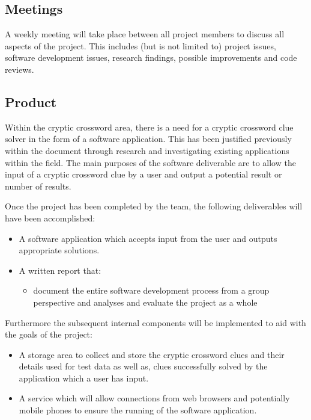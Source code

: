 \subsection{Meetings}

A weekly meeting will take place between all project members to discuss all
aspects of the project. This includes (but is not limited to) project issues,
software development issues, research findings, possible improvements and code
reviews.


\subsection{Product}

Within the cryptic crossword area, there is a need for a cryptic crossword clue
solver in the form of a software application.  This has been justified
previously within the document through research and investigating existing
applications within the field. The main purposes of the software deliverable are
to allow the input of a cryptic crossword clue by a user and output a potential 
result or number of results.

Once the project has been completed by the team, the following deliverables will
have been accomplished:

\begin{itemize}
  \item A software application which accepts input from the user and outputs 
        appropriate solutions. 
  \item A written report that:
    \begin{itemize}
      \item document the entire software development process from a group 
            perspective and analyses and evaluate the project as a whole
    \end{itemize}
\end{itemize}

Furthermore the subsequent internal components will be implemented to aid with 
the goals of the project:

\begin{itemize}
  \item A storage area to collect and store the cryptic crossword clues and 
        their details used for test data as well as, clues successfully solved 
        by the application which a user has input.
  \item A service which will allow connections from web browsers and 
        potentially mobile phones to ensure the running of the software 
        application.
\end{itemize}


